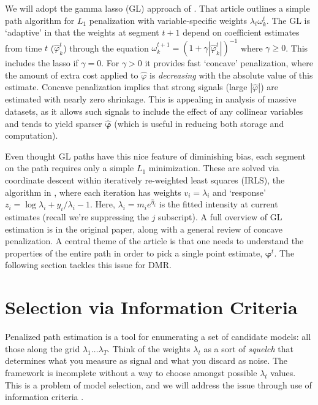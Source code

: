 \documentclass[12pt]{article}
\newcommand{\bs}[1]{\boldsymbol{#1}}
\begin{document}
We will adopt the gamma lasso (GL) approach of
\citet{taddy_gamma_2013}.  That article outlines a simple path
algorithm for $L_1$ penalization with  variable-specific weights $\lambda_t
\omega^t_{k}$.  The GL is `adaptive' in that the  weights at segment
$t+1$ depend on coefficient estimates from time $t$ ($\hat \varphi^t_k$)
through the equation $\omega^{t+1}_k  = \left(1 + \gamma
|\hat\varphi^t_k|\right)^{-1}$ where $\gamma \geq 0$.  This includes the
 lasso if $\gamma=0$.  For $\gamma>0$ it provides fast
`concave' penalization, where  the amount of extra cost applied to
$\hat \varphi$ is {\it decreasing} with the absolute value of this estimate.
Concave penalization implies that strong signals (large $|\hat
\varphi|$) are estimated with nearly zero shrinkage. This is appealing in
analysis of massive datasets, as it allows such signals to include the
effect of any collinear variables and tends to yield sparser $\bs{\hat
\varphi}$ (which is useful in reducing both storage and computation).

Even thought GL paths have this nice feature of diminishing bias, each segment
on the path requires only a simple $L_1$ minimization.  These are solved via
coordinate descent within iteratively re-weighted least squares (IRLS), the algorithm in \citet[Section
6]{taddy_gamma_2013}, where
each iteration has weights $v_i = \lambda_i$ and `response' $z_i =
\log\lambda_i + y_i/\lambda_i - 1$.  Here, $\lambda_i = m_ie^{\hat\eta_i}$ is the
fitted intensity at current estimates (recall we're suppressing
the $j$  subscript). A full overview of GL estimation is in the original
paper, along with a general review of concave penalization.  A central theme
of the article is that  one needs to understand the properties of the entire
path in order to pick a single point estimate, $\bs{\varphi}^t$.
The following section tackles this issue for DMR.



\section{Selection via Information Criteria}
\label{IC}

Penalized path estimation is a tool for enumerating a set of candidate models:
all those along the grid $\lambda_1 \ldots \lambda_T$.  Think of the weights
$\lambda_t$ as a sort of {\it squelch} that determines what you measure as
signal and what you discard as noise.  The framework is incomplete
without  a way to choose amongst possible $\lambda_t$ values.  This is  a
problem of model selection, and we will address the issue through use of
information criteria \citep[IC; e.g.,][]{efron_estimation_2004}.  
\end{document}
